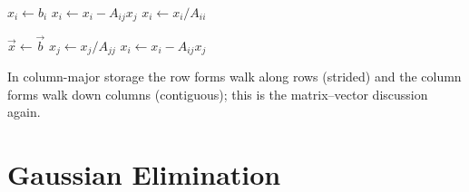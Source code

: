 \begin{algorithm}[H]
  \caption{Back substitution, row-oriented (\texttt{dot} form).}
  \begin{algorithmic}[1]
      \State $x_i \gets b_i$
        \State $x_i \gets x_i - A_{ij}x_j$
      \EndFor
      \State $x_i \gets x_i / A_{ii}$
    \EndFor
  \end{algorithmic}
\end{algorithm}

\begin{algorithm}[H]
  \caption{Back substitution, column-oriented (\texttt{axpy} form).}
  \begin{algorithmic}[1]
    \State $\vec{x} \gets \vec{b}$
      \State $x_j \gets x_j / A_{jj}$
        \State $x_i \gets x_i - A_{ij}x_j$ 
      \EndFor
    \EndFor
  \end{algorithmic}
\end{algorithm}

In column-major storage the row forms walk along rows (strided) and the column forms walk down columns (contiguous); this is the matrix--vector discussion again.

\section{Gaussian Elimination}

